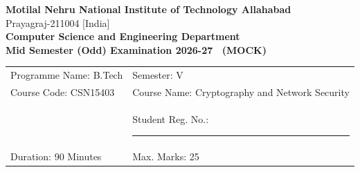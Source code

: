 \documentclass[11pt,a4paper]{article}
\begin{document}
\begin{center}
{\bfseries Motilal Nehru National Institute of Technology Allahabad}\\
Prayagraj-211004 [India]\\[6pt]
{\bfseries Computer Science and Engineering Department}\\
{\bfseries Mid Semester (Odd) Examination 2026-27 \ (MOCK)}
\end{center}
\vspace{2pt}
\begin{tabularx}{\textwidth}{@{}X X@{}}
Programme Name: B.Tech & Semester: V\\
Course Code: CSN15403 & Course Name: Cryptography and Network Security\\
 & Student Reg. No.: \rule{4cm}{0.4pt}\\[4pt]
Duration: 90 Minutes & Max. Marks: 25\\
\end{tabularx}
\end{document}
